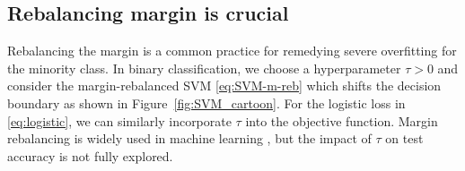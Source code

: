 \subsection{Rebalancing margin is crucial}
\label{subsec:rebal}

Rebalancing the margin is a common practice for remedying severe overfitting for the minority class. In binary classification, we choose a hyperparameter $\tau > 0$ and consider the margin-rebalanced SVM \cref{eq:SVM-m-reb} which shifts the decision boundary as shown in Figure~\ref{fig:SVM_cartoon}. For the logistic loss in \cref{eq:logistic}, we can similarly incorporate $\tau$ into the objective function. Margin rebalancing is widely used in machine learning \cite{li2002perceptron, li2005using, cao2019learning, karakoulas1998optimizing, wu2003class}, but the impact of $\tau$ on test accuracy is not fully explored. 

